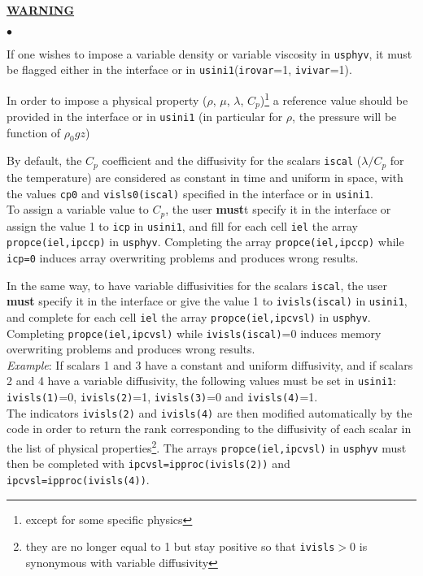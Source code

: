 {{{{\bf \underline{WARNING}}\label{prg_propvar}%
\begin{list}{$\bullet$}{}
\item If one wishes to impose a variable density or variable viscosity in
      \texttt{usphyv}, it must be flagged either in the interface or in
      \texttt{usini1}(\texttt{irovar}=1, \texttt{ivivar}=1).
\item In order to impose a physical property ($\rho$, $\mu$,
      $\lambda$, $C_p$)\footnote{except for some specific physics} a reference
      value should be provided in the interface or in \texttt{usini1} (in
      particular for $\rho$, the pressure will be function of $\rho_0 gz$)
\item By default, the $C_p$ coefficient and the
      diffusivity for the scalars \texttt{iscal} ($\lambda/C_p$ for the
      temperature) are considered as constant in time and uniform in
      space, with the values \texttt{cp0} and \texttt{visls0(iscal)}
      specified in the interface or in \texttt{usini1}.\\
To assign a variable value to $C_p$, the user \textbf{must}t specify it in the
      interface or assign the value 1 to \texttt{icp} in \texttt{usini1},
      and fill for each cell \texttt{iel} the array
      \texttt{propce(iel,ipccp)} in \texttt{usphyv}. Completing the array
      \texttt{propce(iel,ipccp)} while \texttt{icp=0} induces array
      overwriting problems and produces wrong results.

\item In the same way, to have variable diffusivities for the scalars
      \texttt{iscal}, the user \textbf{must} specify it in the interface or give the value
      1 to \texttt{ivisls(iscal)} in \texttt{usini1}, and complete for each cell
      \texttt{iel} the array \texttt{propce(iel,ipcvsl)} in \texttt{usphyv}.
      Completing \texttt{propce(iel,ipcvsl)} while \texttt{ivisls(iscal)}=0
      induces memory overwriting problems and produces wrong results.\\

{\em Example}: If scalars 1 and 3 have a constant and uniform
      diffusivity, and if scalars 2 and 4 have a variable diffusivity,
      the following values must be set in \texttt{usini1}: \\
      \texttt{ivisls(1)}=0, \texttt{ivisls(2)}=1, \texttt{ivisls(3)}=0
      and \texttt{ivisls(4)}=1. \\
      The indicators \texttt{ivisls(2)} and \texttt{ivisls(4)} are then
      modified automatically by the code in order to return the rank
      corresponding to the diffusivity of each scalar in the list of physical
      properties\footnote{they are no longer equal to 1 but stay positive
      so that \texttt{ivisls}$>$0 is synonymous with variable diffusivity}.
      The arrays \mbox{\texttt{propce(iel,ipcvsl)}} in \texttt{usphyv} must
      then be completed with \texttt{ipcvsl=ipproc(ivisls(2))} and
      \texttt{ipcvsl=ipproc(ivisls(4))}. \\


\end{list}}}}
